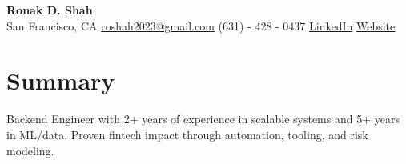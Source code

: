 \documentclass[letterpaper,10pt]{article}
\begin{document}
\begin{center}
    \textbf{\Huge Ronak D. Shah}\\
    San Francisco, CA \hspace{1em} \href{mailto:roshah2023@gmail.com}{roshah2023@gmail.com} \hspace{1em} (631) - 428 - 0437 \hspace{1em} \href{http://www.linkedin.com/in/ronakshah52}{LinkedIn} \hspace{1em} \href{https://ronakdshah.github.io/}{Website}
\end{center}
\section*{Summary}
Backend Engineer with 2+ years of experience in scalable systems and 5+ years in ML/data. Proven fintech impact through automation, tooling, and risk modeling.
\end{document}
